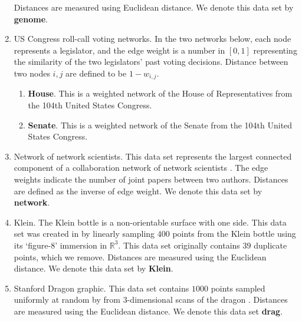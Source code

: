 \documentclass[11pt,onecolumn]{article}
\theoremstyle{plain}
\theoremstyle{definition}
\begin{document}
\begin{enumerate}
    Distances are measured using Euclidean distance. We denote this data set by \textbf{genome}.
    \item US Congress roll-call voting networks. In the two networks below, each node represents a legislator, and the edge weight is a number in $[0,1]$ representing the similarity of the two legislators' past voting decisions. Distance between two nodes $i,j$ are defined to be $1-w_{i,j}$. 
    \begin{enumerate}
        \item \textbf{House}. This is a weighted network of the House of Representatives from the 104th United States Congress.  
        \item \textbf{Senate}. This is a weighted network of the Senate from the 104th United States Congress.
    \end{enumerate}
    \item Network of network scientists. This data set represents the largest connected component of a collaboration network of network scientists \cite{newman2006finding}. The edge weights indicate the number of joint papers between two authors. Distances are defined as the inverse of edge weight. 
    We denote this data set by \textbf{network}. 
    \item Klein. The Klein bottle is a non-orientable surface with one side. This data set was created in \cite{roadmap2017} by linearly sampling $400$ points from the Klein bottle using its  `figure-8' immersion in $\mathbb{R}^3$. This data set originally contains $39$ duplicate points, which we remove. Distances are measured using the Euclidean distance. 
    We denote this data set by \textbf{Klein}. 
    \item Stanford Dragon graphic. This data set contains $1000$ points sampled uniformly  at random by \cite{roadmap2017} from $3$-dimensional scans of the dragon \cite{drag}. Distances are measured using the Euclidean distance. We denote this data set \textbf{drag}. 
\end{enumerate}
\end{document}
